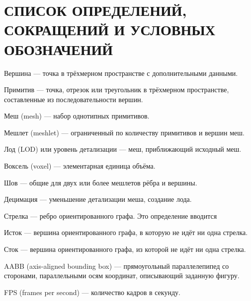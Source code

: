 \clearpage
\section{СПИСОК ОПРЕДЕЛЕНИЙ, СОКРАЩЕНИЙ И УСЛОВНЫХ ОБОЗНАЧЕНИЙ}

Вершина --- точка в трёхмерном пространстве с дополнительными данными.

Примитив --- точка, отрезок или треугольник в трёхмерном пространстве, составленные из последовательности вершин.

Меш (mesh) --- набор однотипных примитивов.

Мешлет (meshlet) --- ограниченный по количеству примитивов и вершин меш.

Лод (LOD) или уровень детализации --- меш, приближающий исходный меш.

Воксель (voxel) --- элементарная единица объёма.

Шов --- общие для двух или более мешлетов рёбра и вершины.

Децимация --- уменьшение детализации меша, создание лода.

Стрелка --- ребро ориентированного графа. Это определение вводится

Исток --- вершина ориентированного графа, в которую не идёт ни одна стрелка.

Сток --- вершина ориентированного графа, из которой не идёт ни одна стрелка.

AABB (axis-aligned bounding box) --- прямоугольный параллелепипед со сторонами, параллельными осям координат, описывающий заданную фигуру.

FPS (frames per second) --- количество кадров в секунду.

